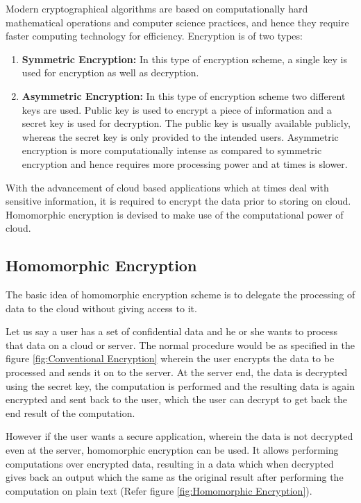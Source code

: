 Modern cryptographical algorithms are based on computationally hard mathematical operations and computer science practices, and hence they require faster computing technology for efficiency.
Encryption is of two types:
\begin{enumerate}
\item \textbf{Symmetric Encryption:} In this type of encryption scheme, a single key is used for encryption as well as decryption.
\item \textbf{Asymmetric Encryption:} In this type of encryption scheme two different keys are used. Public key is used to encrypt a piece of information and a secret key is used for decryption. The public key is usually available publicly, whereas the secret key is only provided to the intended users. Asymmetric encryption is more computationally intense as compared to symmetric encryption and hence requires more processing power and at times is slower. 



\end{enumerate}
With the advancement of cloud based applications which at times deal with sensitive information, it is required to encrypt the data prior to storing on cloud. Homomorphic encryption is devised to make  use of the computational power of cloud.
\subsection{Homomorphic Encryption}
The basic idea of homomorphic encryption scheme is to delegate the processing of data to the cloud without giving access to it.

\vspace{0.25cm}

\noindent Let us say a user has  a set of confidential data and he or she wants to process that data on a cloud or server. The normal procedure would be as specified in the figure \ref{fig:Conventional Encryption} wherein the user encrypts the data to be processed and sends it on to the server. At the server end, the data is decrypted using the secret key, the computation is performed and the resulting data is again encrypted and sent back to the user, which the user can decrypt to get back the end result of the computation.


\vspace{0.25cm}
However if the user wants a secure application, wherein the data is not decrypted even at the server, homomorphic encryption can be used. It allows performing computations over encrypted data, resulting in a data which when decrypted gives back an output which the same as the original result after performing the computation on plain text (Refer figure \ref{fig:Homomorphic Encryption}).

